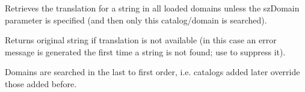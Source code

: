 \label{wxlocalegetstring}


Retrieves the translation for a string in all loaded domains unless the szDomain
parameter is specified (and then only this catalog/domain is searched).

Returns original string if translation is not available
(in this case an error message is generated the first time
a string is not found; use  to suppress it).


Domains are searched in the last to first order, i.e. catalogs
added later override those added before.

